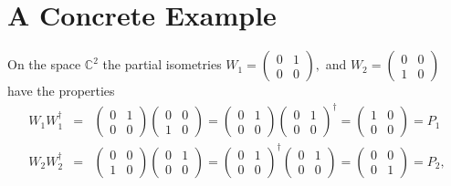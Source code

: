 \documentclass{article}
\begin{document}
\section{A Concrete Example}

On the space $\mathbb{C}^{2}$ the partial isometries $W_{1}=\left( 
\begin{array}{cc}
0 & 1 \\ 
0 & 0%
\end{array}%
\right) ,$ and $W_{2}=\left( 
\begin{array}{cc}
0 & 0 \\ 
1 & 0%
\end{array}%
\right) $ have the properties 
\begin{eqnarray}
W_{1}W_{1}^{\dagger } &=&\left( 
\begin{array}{cc}
0 & 1 \\ 
0 & 0%
\end{array}%
\right) \left( 
\begin{array}{cc}
0 & 0 \\ 
1 & 0%
\end{array}%
\right) =\left( 
\begin{array}{cc}
0 & 1 \\ 
0 & 0%
\end{array}%
\right) \left( 
\begin{array}{cc}
0 & 1 \\ 
0 & 0%
\end{array}%
\right) ^{\dagger }=\left( 
\begin{array}{cc}
1 & 0 \\ 
0 & 0%
\end{array}%
\right) =P_{1} \\
W_{2}W_{2}^{\dagger } &=&\left( 
\begin{array}{cc}
0 & 0 \\ 
1 & 0%
\end{array}%
\right) \left( 
\begin{array}{cc}
0 & 1 \\ 
0 & 0%
\end{array}%
\right) =\left( 
\begin{array}{cc}
0 & 1 \\ 
0 & 0%
\end{array}%
\right) ^{\dagger }\left( 
\begin{array}{cc}
0 & 1 \\ 
0 & 0%
\end{array}%
\right) =\left( 
\begin{array}{cc}
0 & 0 \\ 
0 & 1%
\end{array}%
\right) =P_{2},
\end{eqnarray}%
\end{document}
